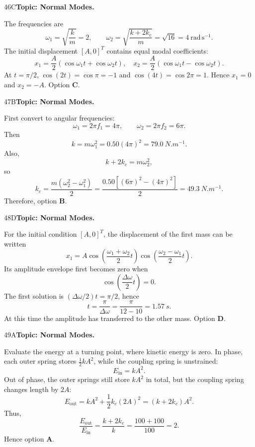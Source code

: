 \documentclass[10pt,a4paper]{physicsquiz}
\begin{document}
\begin{workedsolution}{46}{C}\textbf{Topic: Normal Modes.}\par The frequencies are
  \[
    \omega_1=\sqrt{\frac{k}{m}}=2,
    \qquad
    \omega_2=\sqrt{\frac{k+2k_c}{m}}=\sqrt{16}=4\ \mathrm{rad\,s^{-1}}.
  \]
  The initial displacement \({[A,0]}^T\) contains equal modal coefficients:
  \[
    x_1=\frac{A}{2}(\cos\omega_1t+\cos\omega_2t),
    \quad
    x_2=\frac{A}{2}(\cos\omega_1t-\cos\omega_2t).
  \]
  At \(t=\pi/2\), \(\cos(2t)=\cos\pi=-1\) and \(\cos(4t)=\cos2\pi=1\). Hence \(x_1=0\) and \(x_2=-A\). Option \textbf{C}.\end{workedsolution}
\begin{workedsolution}{47}{B}\textbf{Topic: Normal Modes.}\par First convert to angular frequencies:
  \[
    \omega_1=2\pi f_1=4\pi,
    \qquad
    \omega_2=2\pi f_2=6\pi.
  \]
  Then
  \[
    k=m\omega_1^2=0.50{(4\pi)}^2=\SI{79.0}{N.m^{-1}}.
  \]
  Also,
  \[
    k+2k_c=m\omega_2^2,
  \]
  so
  \[
    k_c=\frac{m(\omega_2^2-\omega_1^2)}{2}
    =\frac{0.50[{(6\pi)}^2-{(4\pi)}^2]}{2}
    =\SI{49.3}{N.m^{-1}}.
  \]
  Therefore, option \textbf{B}.\end{workedsolution}
\begin{workedsolution}{48}{D}\textbf{Topic: Normal Modes.}\par For the initial condition \({[A,0]}^T\), the displacement of the first mass can be written
  \[
    x_1=A\cos\left(\frac{\omega_1+\omega_2}{2}t\right)
    \cos\left(\frac{\omega_2-\omega_1}{2}t\right).
  \]
  Its amplitude envelope first becomes zero when
  \[
    \cos\left(\frac{\Delta\omega}{2}t\right)=0.
  \]
  The first solution is \((\Delta\omega/2)t=\pi/2\), hence
  \[
    t=\frac{\pi}{\Delta\omega}=\frac{\pi}{12-10}=\SI{1.57}{s}.
  \]
  At this time the amplitude has transferred to the other mass. Option \textbf{D}.\end{workedsolution}
\begin{workedsolution}{49}{A}\textbf{Topic: Normal Modes.}\par Evaluate the energy at a turning point, where kinetic energy is zero. In phase, each outer spring stores \(\tfrac12kA^2\), while the coupling spring is unstrained:
  \[
    E_{\mathrm{in}}=kA^2.
  \]
  Out of phase, the outer springs still store \(kA^2\) in total, but the coupling spring changes length by \(2A\):
  \[
    E_{\mathrm{out}}=kA^2+\frac12k_c{(2A)}^2={(k+2k_c)}A^2.
  \]
  Thus,
  \[
    \frac{E_{\mathrm{out}}}{E_{\mathrm{in}}}=\frac{k+2k_c}{k}=\frac{100+100}{100}=2.
  \]
  Hence option \textbf{A}.\end{workedsolution}
\end{document}
